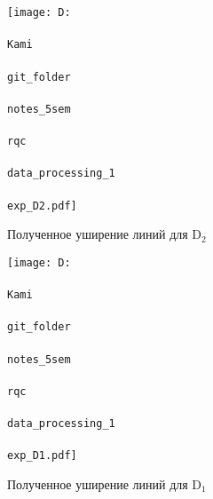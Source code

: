 \begin{figure}[h]
    \centering
    \texttt{[image: D:\\\\Kami\\\\git\_folder\\\\notes\_5sem\\\\rqc\\\\data\_processing\_1\\\\exp\_D2.pdf]}
    \caption{Полученное уширение линий для D$_2$}
    \label{fig:expD2}
\end{figure}


\begin{figure}[h]
    \centering
    \texttt{[image: D:\\\\Kami\\\\git\_folder\\\\notes\_5sem\\\\rqc\\\\data\_processing\_1\\\\exp\_D1.pdf]}
    \caption{Полученное уширение линий для D$_1$}
    \label{fig:expD1}
\end{figure}